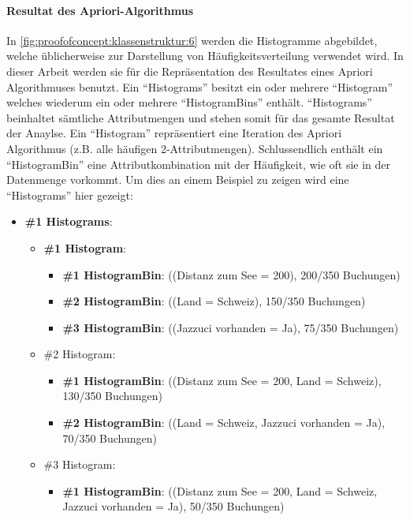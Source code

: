 \paragraph{Resultat des Apriori-Algorithmus} In \cref{fig:proofofconcept:klassenstruktur:6} werden die Histogramme abgebildet, welche üblicherweise zur Darstellung von Häufigkeitsverteilung verwendet wird. In dieser Arbeit werden sie für die Repräsentation des Resultates eines Apriori Algorithmuses benutzt. 
Ein "`Histograms"' besitzt ein oder mehrere "`Histogram"' welches wiederum ein oder mehrere "`HistogramBins"' enthält. "`Histograms"' beinhaltet sämtliche Attributmengen und stehen somit für das gesamte Resultat der Anaylse. Ein "`Histogram"' repräsentiert eine Iteration des Apriori Algorithmus (z.B. alle häufigen 2-Attributmengen). Schlussendlich enthält ein "`HistogramBin"' eine Attributkombination mit der Häufigkeit, wie oft sie in der Datenmenge vorkommt. Um dies an einem Beispiel zu zeigen wird eine "`Histograms"' hier gezeigt:
\begin{itemize}
\item \textbf{\#1 Histograms}:
	\begin{itemize}
		\item \textbf{\#1 Histogram}:
			\begin{itemize}
				\item \textbf{\#1 HistogramBin}: ((Distanz zum See = 200), 200/350 Buchungen)
				\item \textbf{\#2 HistogramBin}: ((Land = Schweiz), 150/350 Buchungen)
				\item \textbf{\#3 HistogramBin}: ((Jazzuci vorhanden = Ja), 75/350 Buchungen)
			\end{itemize}  
		\item \#2 Histogram:
			\begin{itemize}
				\item \textbf{\#1 HistogramBin}: ((Distanz zum See = 200, Land = Schweiz), 130/350 Buchungen)
				\item \textbf{\#2 HistogramBin}: ((Land = Schweiz, Jazzuci vorhanden = Ja), 70/350 Buchungen)
			\end{itemize}  
		\item \#3 Histogram:
			\begin{itemize}
				\item \textbf{\#1 HistogramBin}: ((Distanz zum See = 200, Land = Schweiz, Jazzuci vorhanden = Ja), 50/350 Buchungen)
			\end{itemize}  
	\end{itemize}  
\end{itemize}  


